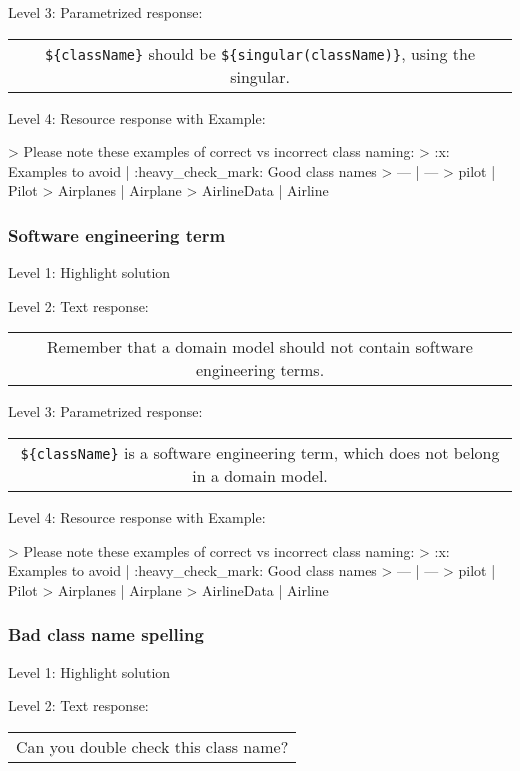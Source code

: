 \noindent Level 3: Parametrized response: \medskip

\begin{tabular}{|c}
\verb|${className}| should be \verb|${singular(className)}|, using the singular.
\end{tabular} \medskip

\noindent Level 4: Resource response with Example:

> Please note these examples of correct vs incorrect class naming:
> :x: Examples to avoid | :heavy_check_mark: Good class names
> --- | ---
> pilot | Pilot
> Airplanes | Airplane 
> AirlineData | Airline


\subsubsection{Software engineering term}

\noindent Level 1: Highlight solution \medskip

\noindent Level 2: Text response: \medskip

\begin{tabular}{|c}
Remember that a domain model should not contain software engineering terms.
\end{tabular} \medskip

\noindent Level 3: Parametrized response: \medskip

\begin{tabular}{|c}
\verb|${className}| is a software engineering term, which does not belong in a domain model.
\end{tabular} \medskip

\noindent Level 4: Resource response with Example:

> Please note these examples of correct vs incorrect class naming:
> :x: Examples to avoid | :heavy_check_mark: Good class names
> --- | ---
> pilot | Pilot
> Airplanes | Airplane 
> AirlineData | Airline


\subsubsection{Bad class name spelling}

\noindent Level 1: Highlight solution \medskip

\noindent Level 2: Text response: \medskip

\begin{tabular}{|c}
Can you double check this class name?
\end{tabular} \medskip

